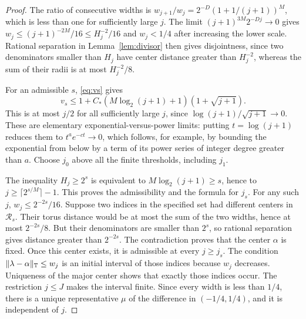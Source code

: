 \documentclass[11pt,oneside]{article}
\theoremstyle{definition}\newtheorem{definition}[theorem]{Definition}
\theoremstyle{remark}\newtheorem{remark}[theorem]{Remark}
\begin{document}
\begin{proof}
The ratio of consecutive widths is
$w_{j+1}/w_j=2^{-D}(1+1/(j+1))^M$, which is less than one for sufficiently
large $j$. The limit $(j+1)^{3M}2^{-Dj}\to0$ gives
$w_j\leq (j+1)^{-2M}/16\leq H_j^{-2}/16$ and $w_j<1/4$ after increasing
the lower scale. Rational separation in Lemma~\ref{lem:divisor} then gives
disjointness, since two denominators smaller than $H_j$ have center distance
greater than $H_j^{-2}$, whereas the sum of their radii is at most
$H_j^{-2}/8$.

For an admissible $s$, \eqref{eq:vs} gives
\[
 v_s\leq1+C_*(M\log_2(j+1)+1)(1+\sqrt{j+1}).
\]
This is at most $j/2$ for all sufficiently large $j$, since
$\log(j+1)/\sqrt{j+1}\to0$. These are elementary exponential-versus-power
limits: putting $t=\log(j+1)$ reduces them to $t^ae^{-ct}\to0$, which follows,
for example, by bounding the exponential from below by a term of its power
series of integer degree greater than $a$. Choose $j_0$ above all the finite
thresholds, including $j_1$.

The inequality $H_j\geq2^s$ is equivalent to
$M\log_2(j+1)\geq s$, hence to $j\geq\lceil2^{s/M}\rceil-1$.
This proves the admissibility and the formula for $j_s$.
For any such $j$, $w_j\leq2^{-2s}/16$.
Suppose two indices in the specified set had different centers in
$\mathcal R_s$. Their torus distance would be at most the sum of the two
widths, hence at most $2^{-2s}/8$. But their denominators are smaller than
$2^s$, so rational separation gives distance greater than $2^{-2s}$.
The contradiction proves that the center $\alpha$ is fixed.
Once this center exists, it is admissible at every $j\geq j_s$.
The condition $\|\lambda-\alpha\|_\mathbb T\leq w_j$ is an initial interval of
those indices because $w_j$ decreases. Uniqueness of the major center shows
that exactly those indices occur. The restriction $j\leq J$ makes the
interval finite. Since every width is less than $1/4$, there is a unique
representative $\mu$ of the difference in $(-1/4,1/4)$, and it is independent
of $j$.
\end{proof}
\end{document}
